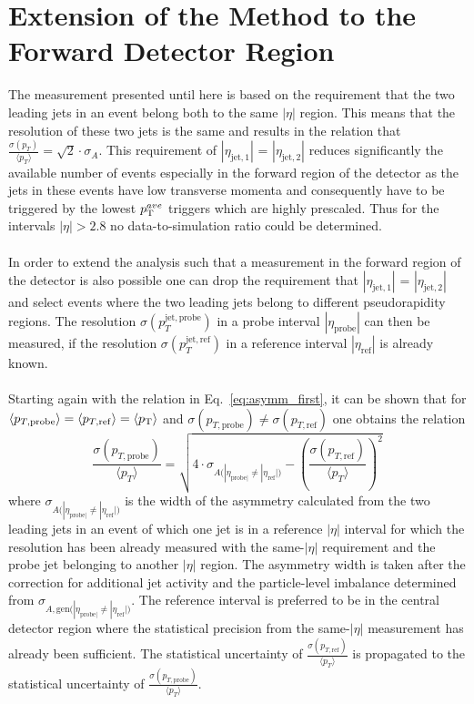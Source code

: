 \section{Extension of the Method to the Forward Detector Region}
\label{sec:jer_forward_extension}
The measurement presented until here is based on the requirement that the two leading jets in an event belong both to the same $|\eta|$ region. This means that the resolution of these two jets is the same and results in the relation that $\frac{\sigma (p_{T})}{\langle p_{T} \rangle} = \sqrt{2} \cdot \sigma_{A}$. This requirement of $|\eta_{\mathrm{jet},1}|$ = $|\eta_{\mathrm{jet},2}|$ reduces significantly the available number of events especially in the forward region of the detector as the jets in these events have low transverse momenta and consequently have to be triggered by the lowest $p_{\text{T}}^{ave}$ triggers which are highly prescaled. Thus for the intervals $|\eta| > 2.8$ no data-to-simulation ratio could be determined. \\
\\
In order to extend the analysis such that a measurement in the forward region of the detector is also possible one can drop the requirement that $|\eta_{\mathrm{jet},1}|$ = $|\eta_{\mathrm{jet},2}|$ and select events where the two leading jets belong to different pseudorapidity regions. The resolution $\sigma (p_{T}^{\mathrm{jet, probe}})$ in a probe interval $|\eta_\mathrm{probe}|$ can then be measured, if the resolution $\sigma (p_{T}^{\mathrm{jet, ref}})$ in a reference interval $|\eta_\mathrm{ref}|$ is already known. \\
\\
Starting again with the relation in Eq.~\ref{eq:asymm_first}, it can be shown that for $\langle p_{T,\mathrm{probe}} \rangle = \langle p_{T,\mathrm{ref}} \rangle = \langle p_{\text{T}} \rangle$ and $\sigma (p_{T,\mathrm{probe}}) \neq \sigma (p_{T,\mathrm{ref}})$ one obtains the relation
\begin{equation}
 \label{eq:asymm_forward}
  \frac{\sigma (p_{T, \mathrm{probe}})}{\langle p_{T} \rangle} = \sqrt{4 \cdot \sigma_{A({|\eta_{\mathrm{probe}|} \neq |\eta_{\mathrm{ref}}|)}} - \left(\frac{\sigma (p_{T, \mathrm{ref}})}{\langle p_{T} \rangle} \right)^2} 
 \end{equation}
where $\sigma_{A({|\eta_{\mathrm{probe}|} \neq |\eta_{\mathrm{ref}}|)}}$ is the width of the asymmetry calculated from the two leading jets in an event of which one jet is in a reference $|\eta|$ interval for which the resolution has been already measured with the same-$|\eta|$ requirement and the probe jet belonging to another $|\eta|$ region. The asymmetry width is taken after the correction for additional jet activity and the particle-level imbalance determined from $\sigma_{A, \mathrm{gen} ({|\eta_{\mathrm{probe}|} \neq |\eta_{\mathrm{ref}}|)}}$. The reference interval is preferred to be in the central detector region where the statistical precision from the same-$|\eta|$ measurement has already been sufficient. The statistical uncertainty of $\frac{\sigma (p_{T, \mathrm{ref}})}{{\langle p_{T} \rangle}}$ is propagated to the statistical uncertainty of $\frac{\sigma (p_{T, \mathrm{probe}})}{\langle p_{T} \rangle}$. \\
